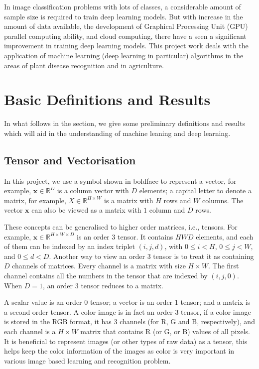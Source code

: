 \documentclass[12pt]{report}
\numberwithin{equation}{section}
\begin{document}
In image classification problems with lots of classes, a considerable amount of sample size is required to train deep learning models. But with increase in the amount of data available, the development of Graphical Processing Unit (GPU) parallel computing ability, and cloud computing, there have a seen a significant improvement in training deep learning models. This project work deals with the application of machine learning (deep learning in particular) algorithms in the areas of plant disease recognition and  in agriculture.

\section{Basic Definitions and Results}
In what follows in the section, we give some preliminary definitions and results which will aid in the understanding of machine leaning and deep learning.

\subsection{Tensor and Vectorisation}
In this project, we use a symbol shown in boldface to represent a vector, for example, $\bm{x} \in \mathbb{R}^D$ is a column vector with $D$ elements; a capital letter to denote a matrix, for example, $X \in \mathbb{R}^{H\times W}$ is a matrix with $H$ rows and $W$ columns. The vector $\bm{x}$ can also be viewed as a matrix with $1$ column and $D$ rows.

These concepts can be generalised to higher order matrices, i.e., tensors. For example, $\bm{x} \in \mathbb{R}^{H\times W\times D}$ is an order 3 tensor. It contains $HWD$ elements, and each of them can be indexed by an index triplet $(i,j,d)$, with $0\leq i < H$, $0\leq j < W$, and $0\leq d < D$. Another way to view an order $3$ tensor is to treat it as containing $D$ channels of matrices. Every channel is a matrix with size $H \times W$. The first channel contains all the numbers in the tensor that are indexed by $(i,j,0)$. When $D=1$, an order $3$ tensor reduces to a matrix.

A scalar value is an order $0$ tensor; a vector is an order $1$ tensor; and a matrix is a second order tensor. A color image is in fact an order $3$ tensor, if a color image is stored in the RGB format, it has $3$ channels (for R, G and B, respectively), and each channel is a $H\times W$ matrix that contains R (or G, or B) values of all pixels. It is beneficial to represent images (or other types of raw data) as a tensor, this helps keep the color information of the images as color is very important in various image based learning and recognition problem. 
\end{document}
